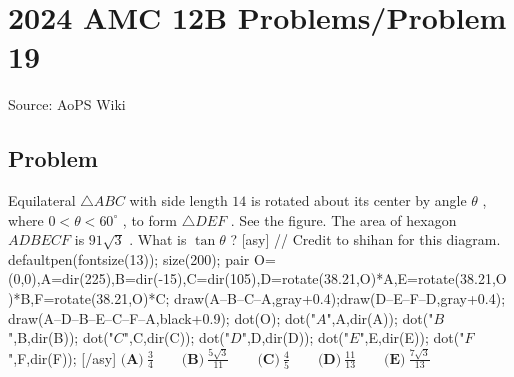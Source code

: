 \documentclass[12pt]{article}
\begin{document}
\section*{{2024 AMC 12B Problems/Problem 19}}
Source: AoPS Wiki

\subsection*{Problem}
Equilateral $\triangle ABC$ with side length $14$ is rotated about its center by angle $\theta$ , where $0 < \theta < 60^{\circ}$ , to form $\triangle DEF$ . See the figure. The area of hexagon $ADBECF$ is $91\sqrt{3}$ . What is $\tan\theta$ ? [asy] // Credit to shihan for this diagram. defaultpen(fontsize(13)); size(200); pair O=(0,0),A=dir(225),B=dir(-15),C=dir(105),D=rotate(38.21,O)*A,E=rotate(38.21,O)*B,F=rotate(38.21,O)*C; draw(A--B--C--A,gray+0.4);draw(D--E--F--D,gray+0.4); draw(A--D--B--E--C--F--A,black+0.9); dot(O); dot("$A$",A,dir(A)); dot("$B$",B,dir(B)); dot("$C$",C,dir(C)); dot("$D$",D,dir(D)); dot("$E$",E,dir(E)); dot("$F$",F,dir(F)); [/asy] $\textbf{(A)}~\frac{3}{4}\qquad\textbf{(B)}~\frac{5\sqrt{3}}{11}\qquad\textbf{(C)}~\frac{4}{5}\qquad\textbf{(D)}~\frac{11}{13}\qquad\textbf{(E)}~\frac{7\sqrt{3}}{13}$
\end{document}
